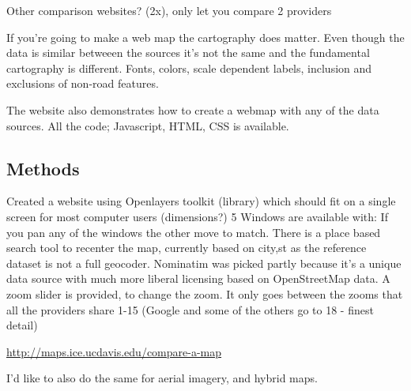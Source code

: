 \documentclass[12pt,letterpaper]{article}
\begin{document}
Other comparison websites? (2x), only let you compare 2 providers

If you're going to make a web map the cartography does matter. Even though the data is similar betweeen the sources it's not the same and the fundamental cartography is different. 
Fonts, colors, scale dependent labels, inclusion and exclusions of non-road features.

The website also demonstrates how to create a webmap with any of the data sources. All the code; Javascript, HTML, CSS is available.

\subsection{Methods}
Created a website using Openlayers toolkit (library) which should fit on a single screen for most computer users (dimensions?)
5 Windows are available with:
If you pan any of the windows the other move to match.
There is a place based search tool to recenter the map, currently based on city,st as the reference dataset is not a full geocoder. Nominatim was picked partly because it's a unique data source with much more liberal licensing based on OpenStreetMap data.
A zoom slider is provided, to change the zoom. It only goes between the zooms that all the providers share 1-15 (Google and some of the others go to 18 - finest detail)

\url{http://maps.ice.ucdavis.edu/compare-a-map}

I'd like to also do the same for aerial imagery, and hybrid maps.


\end{document}
